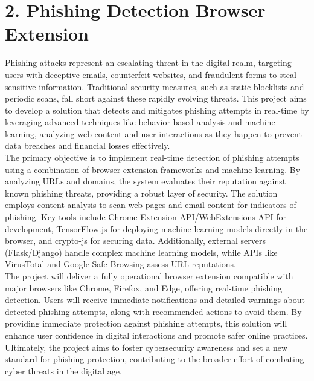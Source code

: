 \documentclass[12pt]{book}
\begin{document}
	\chapter*{2. Phishing Detection Browser Extension}
	\thispagestyle{empty}
	Phishing attacks represent an escalating threat in the digital realm, targeting users with deceptive emails, counterfeit websites, and fraudulent forms to steal sensitive information. Traditional security measures, such as static blocklists and periodic scans, fall short against these rapidly evolving threats. This project aims to develop a solution that detects and mitigates phishing attempts in real-time by leveraging advanced techniques like behavior-based analysis and machine learning, analyzing web content and user interactions as they happen to prevent data breaches and financial losses effectively.\\
	
	The primary objective is to implement real-time detection of phishing attempts using a combination of browser extension frameworks and machine learning. By analyzing URLs and domains, the system evaluates their reputation against known phishing threats, providing a robust layer of security. The solution employs content analysis to scan web pages and email content for indicators of phishing. Key tools include Chrome Extension API/WebExtensions API for development, TensorFlow.js for deploying machine learning models directly in the browser, and crypto-js for securing data. Additionally, external servers (Flask/Django) handle complex machine learning models, while APIs like VirusTotal and Google Safe Browsing assess URL reputations.\\
	
	The project will deliver a fully operational browser extension compatible with major browsers like Chrome, Firefox, and Edge, offering real-time phishing detection. Users will receive immediate notifications and detailed warnings about detected phishing attempts, along with recommended actions to avoid them. By providing immediate protection against phishing attempts, this solution will enhance user confidence in digital interactions and promote safer online practices. Ultimately, the project aims to foster cybersecurity awareness and set a new standard for phishing protection, contributing to the broader effort of combating cyber threats in the digital age.
	
\end{document}
